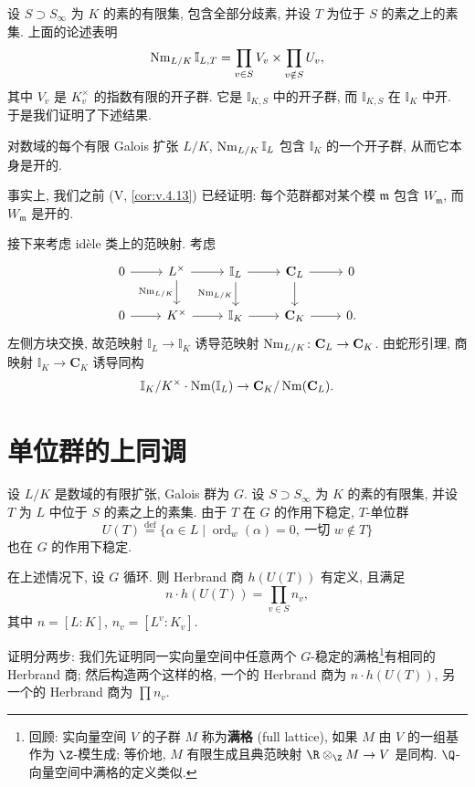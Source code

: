 设 $S\supset S_{\infty}$ 为 $K$ 的素的有限集, 包含全部分歧素, 并设 $T$ 为位于 $S$ 的素之上的素集. 上面的论述表明
\[
\operatorname{Nm}_{L/K}\mathbb{I}_{L,T}=\prod_{v\in S}V_{v}\times\prod_{v\notin S}U_{v},
\]
其中 $V_v$ 是 $K_v^{\times}$ 的指数有限的开子群. 它是 $\mathbb{I}_{K,S}$ 中的开子群, 而 $\mathbb{I}_{K,S}$ 在 $\mathbb{I}_K$ 中开. 于是我们证明了下述结果.

\begin{proposition}\label{prop:vii.2.8}
对数域的每个有限 Galois 扩张 $L/K$, $\operatorname{Nm}_{L/K}\mathbb{I}_L$ 包含 $\mathbb{I}_K$ 的一个开子群, 从而它本身是开的.
\end{proposition}

事实上, 我们之前 (V, \ref{cor:v.4.13}) 已经证明: 每个范群都对某个模 $\mathfrak{m}$ 包含 $W_{\mathfrak{m}}$, 而 $W_{\mathfrak{m}}$ 是开的.

接下来考虑 idèle 类上的范映射. 考虑
\[
\begin{tikzcd}
0\ar[r] & L^{\times}\ar[r]\ar[d, "\Nm_{L/K}"'] & \mathbb{I}_{L}\ar[r]\ar[d, "\Nm_{L/K}"'] & \mathbf{C}_{L}\ar[r]\ar[d] & 0\\
0\ar[r] & K^{\times}\ar[r] & \mathbb{I}_{K}\ar[r] & \mathbf{C}_{K}\ar[r] & 0.
\end{tikzcd}
\]
左侧方块交换, 故范映射 $\mathbb{I}_L\to\mathbb{I}_K$ 诱导范映射 $\operatorname{Nm}_{L/K}\colon\mathbf{C}_L\to\mathbf{C}_K$. 由蛇形引理, 商映射 $\mathbb{I}_K\to\mathbf{C}_K$ 诱导同构
\[
\mathbb{I}_{K}/K^{\times}\cdot\operatorname{Nm}(\mathbb{I}_{L})\to\mathbf{C}_{K}/\operatorname{Nm}(\mathbf{C}_{L}).
\]

\section{单位群的上同调}\label{sec:VII.3}

设 $L/K$ 是数域的有限扩张, Galois 群为 $G$. 设 $S\supset S_{\infty}$ 为 $K$ 的素的有限集, 并设 $T$ 为 $L$ 中位于 $S$ 的素之上的素集. 由于 $T$ 在 $G$ 的作用下稳定, $T$-单位群
\[
U(T)\overset{\mathrm{def}}{=}\{\alpha\in L\mid\operatorname{ord}_{w}(\alpha)=0,\ \text{一切 }w\notin T\}
\]
也在 $G$ 的作用下稳定.

\begin{proposition}\label{prop:vii.3.1}
在上述情况下, 设 $G$ 循环. 则 Herbrand 商 $h(U(T))$ 有定义, 且满足
\[
n\cdot h(U(T))=\prod_{v\in S}n_{v},
\]
其中 $n=[L:K]$, $n_v=[L^{v}:K_v]$.
\end{proposition}

证明分两步: 我们先证明同一实向量空间中任意两个 $G$-稳定的满格\footnote{回顾: 实向量空间 $V$ 的子群 $M$ 称为\textbf{满格} (full lattice), 如果 $M$ 由 $V$ 的一组基作为 $\Z$-模生成; 等价地, $M$ 有限生成且典范映射 $\R\otimes_{\Z}M\to V$ 是同构. $\Q$-向量空间中满格的定义类似.}有相同的 Herbrand 商; 然后构造两个这样的格, 一个的 Herbrand 商为 $n\cdot h(U(T))$, 另一个的 Herbrand 商为 $\prod n_v$.

